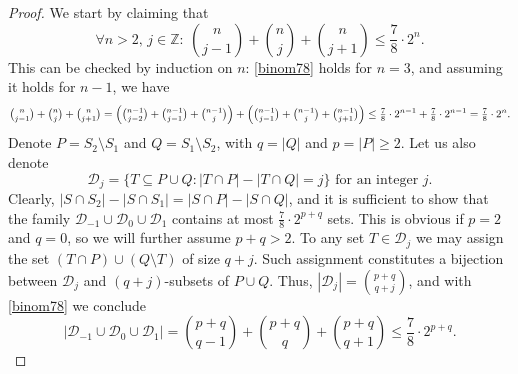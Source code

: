\sufficientFractionLemma*
\begin{proof}
    We start by claiming that
    \begin{equation}\label{binom78}
        \forall n > 2,\,j\in \mathbb{Z}:\: \binom{n}{j-1}+\binom{n}{j}+\binom{n}{j+1} \leq \frac{7}{8}\cdot 2^{n}.
     \end{equation}
    This can be checked by induction on $n$: \eqref{binom78} holds for $n=3$, and assuming it holds for $n-1$, we have
    \[
        \tbinom{n}{j-1}+\tbinom{n}{j}+\tbinom{n}{j+1} = \Bigl(\tbinom{n-1}{j-2}+\tbinom{n-1}{j-1}+\tbinom{n-1}{j}\Bigr) + \Bigl(\tbinom{n-1}{j-1}+\tbinom{n-1}{j}+\tbinom{n-1}{j+1}\Bigr) \leq \tfrac{7}{8}\cdot 2^{n-1} + \tfrac{7}{8}\cdot 2^{n-1} = \tfrac{7}{8}\cdot 2^n.
    \]
    Denote $P = S_2 \setminus S_1$ and $Q = S_1 \setminus S_2$, with $q=|Q|$ and $p=|P|\geq 2$. Let us also denote 
    \[
        \mathcal{D}_j = \{T\subseteq P\cup Q: |T\cap P|-|T\cap Q|=j\}\text{ for an integer }j.
    \] 
    Clearly, $|S\cap S_2| - |S\cap S_1| = |S\cap P| - |S\cap Q|$, and it is sufficient to show that the family $\mathcal{D}_{-1}\cup \mathcal{D}_{0}\cup \mathcal{D}_{1}$ contains at most $\frac{7}{8}\cdot 2^{p+q}$ sets. This is obvious if $p=2$ and $q=0$, so we will further assume $p+q>2$. To any set $T\in \mathcal{D}_j$ we may assign the set $(T\cap P)\cup(Q\setminus T)$ of size $q+j$. Such assignment constitutes a bijection between $\mathcal{D}_j$ and $(q+j)$-subsets of $P\cup Q$. Thus, $|\mathcal{D}_j|=\binom{p+q}{q+j}$, and with \eqref{binom78} we conclude
    \[
        |\mathcal{D}_{-1}\cup \mathcal{D}_{0}\cup \mathcal{D}_{1}| = \binom{p+q}{q-1}+\binom{p+q}{q}+\binom{p+q}{q+1}\leq \frac{7}{8}\cdot 2^{p+q}.
    \]
\end{proof}


